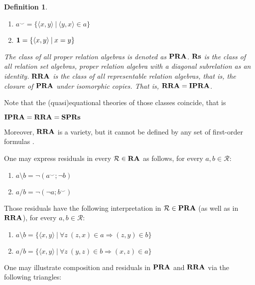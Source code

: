 \documentclass[a4paper]{article}
\theoremstyle{defin}
\newtheorem{defin}{Definition}
\theoremstyle{theorem}
\theoremstyle{prop}
\theoremstyle{lemma}
\theoremstyle{ex}
\theoremstyle{col}
\begin{document}
\begin{defin}
\begin{enumerate}
\begin{enumerate}
    \item $a^{\smile} = \{ \langle x, y \rangle \: | \: \langle y, x \rangle \in a \}$
    \item ${\bf 1} = \{ \langle x, y \rangle \: | \: x = y \}$
    \end{enumerate}
      The class of all proper relation algebras is denoted as ${\bf PRA}$. ${\bf Rs}$ is the class of all relation set algebras, proper relation algebra with a diagonal subrelation as an identity. ${\bf RRA}$ is the class of all representable relation algebras, that is, the closure of ${\bf PRA}$ under isomorphic copies. That is,
      ${\bf RRA} = {\bf IPRA}$.
  \end{enumerate}
\end{defin}
Note that the (quasi)equational theories of those classes coincide, that is
\begin{center}
  ${\bf IPRA} = {\bf RRA} = {\bf SP}{\bf Rs}$
\end{center}
Moreover, ${\bf RRA}$ is a variety, but it cannot be defined by any set of first-order formulas \cite{monk1964representable} \cite{}.

One may express residuals in every $\mathcal{R} \in {\bf RA}$ as follows, for every $a, b \in \mathcal{R}$:

\begin{enumerate}
  \item $a \setminus b = \neg (a^{\smile} ; \neg b)$
  \item $a / b = \neg (\neg a ; b^{\smile})$
\end{enumerate}

Those residuals have the following interpretation in $\mathcal{R} \in {\bf PRA}$ (as well as in ${\bf RRA}$), for every $a, b \in \mathcal{R}$:
\begin{enumerate}
  \item $a \setminus b = \{ \langle x, y \rangle \: | \: \forall z \: (z, x) \in a \Rightarrow (z, y) \in b \}$
  \item $a / b = \{ \langle x, y \rangle \: | \: \forall z \: (y, z) \in b \Rightarrow (x, z) \in a \}$
\end{enumerate}
One may illustrate composition and residuals in ${\bf PRA}$ and ${\bf RRA}$ via the following triangles:

\end{document}
